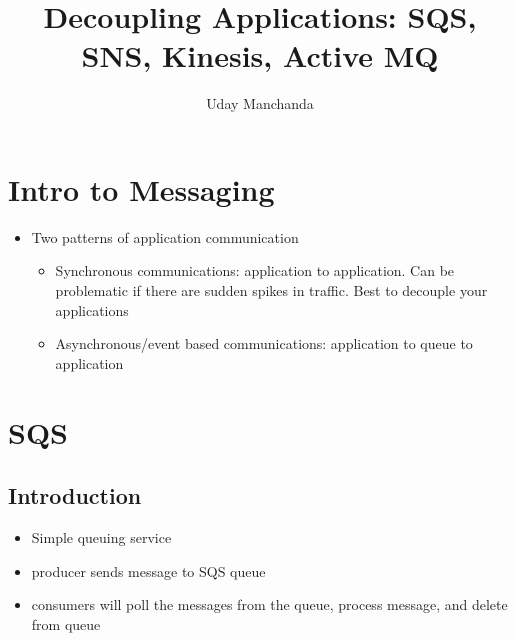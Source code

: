 \documentclass[]{scrartcl}
\title{Decoupling Applications: SQS, SNS, Kinesis, Active MQ}
\author{Uday Manchanda}
\begin{document}
\maketitle

\section{Intro to Messaging}
\begin{itemize}
	\item Two patterns of application communication
	\begin{itemize}
		\item Synchronous communications: application to application. Can be problematic if there are sudden spikes in traffic. Best to decouple your applications
		\item Asynchronous/event based communications: application to queue to application
	\end{itemize}
\end{itemize}

\section{SQS}
\subsection{Introduction}
\begin{itemize}
	\item Simple queuing service
	\item producer sends message to SQS queue
	\item consumers will poll the messages from the queue, process message, and delete from queue
\end{itemize}
\end{document}
